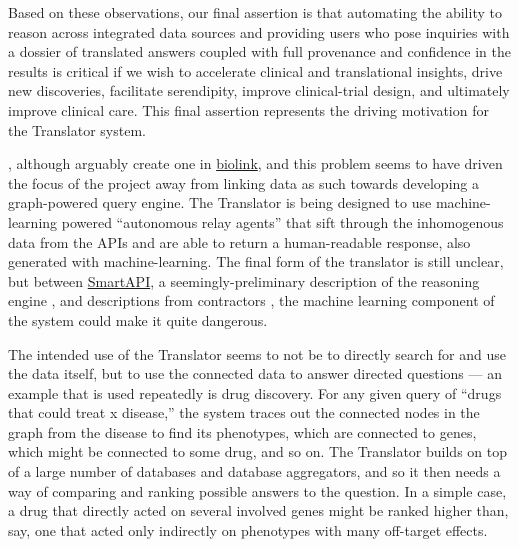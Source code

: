 \documentclass[11pt]{article}
\begin{document}
\begin{multicols}{2}
{\begin{leftbar}
  Based on these observations, our final assertion is that automating
  the ability to reason across integrated data sources and providing
  users who pose inquiries with a dossier of translated answers coupled
  with full provenance and confidence in the results is critical if we
  wish to accelerate clinical and translational insights, drive new
  discoveries, facilitate serendipity, improve clinical-trial design,
  and ultimately improve clinical care. This final assertion represents
  the driving motivation for the Translator system. \cite{consortiumUniversalBiomedicalData2019} 
  \end{leftbar}}\cite{consortiumUniversalBiomedicalData2019} ,
although arguably create one in
\href{https://biolink.github.io/biolink-model/docs/}{biolink}, and this
problem seems to have driven the focus of the project away from linking
data as such towards developing a graph-powered query engine. The
Translator is being designed to use machine-learning powered
``autonomous relay agents'' that sift through the inhomogenous data from
the APIs and are able to return a human-readable response, also
generated with machine-learning. The final form of the translator is
still unclear, but between
\href{https://smart-api.info/portal/translator}{SmartAPI}, a
seemingly-preliminary description of the reasoning engine \cite{goelExplanationContainerCaseBased2021} , and descriptions from
contractors \cite{ROBOKOPCoVar2021} , the machine learning
component of the system could make it quite dangerous.

The intended use of the Translator seems to not be to directly search
for and use the data itself, but to use the connected data to answer
directed questions \cite{goelExplanationContainerCaseBased2021} 
--- an example that is used repeatedly is drug discovery. For any given
query of ``drugs that could treat x disease,'' the system traces out the
connected nodes in the graph from the disease to find its phenotypes,
which are connected to genes, which might be connected to some drug, and
so on. The Translator builds on top of a large number of databases and
database aggregators, and so it then needs a way of comparing and
ranking possible answers to the question. In a simple case, a drug that
directly acted on several involved genes might be ranked higher than,
say, one that acted only indirectly on phenotypes with many off-target
effects.


\end{multicols}
\end{document}
